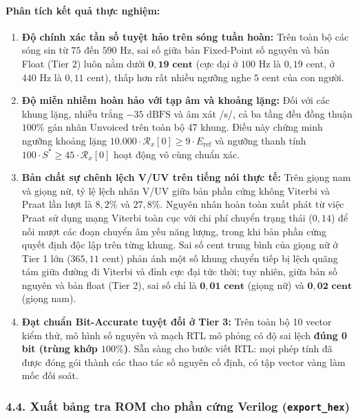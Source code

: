 \documentclass[11pt,a4paper]{article}
\begin{document}
\paragraph{Phân tích kết quả thực nghiệm:}
\begin{enumerate}
    \setlength{\itemsep}{1.5pt}
    \item \textbf{Độ chính xác tần số tuyệt hảo trên sóng tuần hoàn:} Trên toàn bộ các sóng sin từ $75$ đến $590\text{ Hz}$, sai số giữa bản Fixed-Point số nguyên và bản Float (Tier 2) luôn nằm dưới $\mathbf{0{,}19\text{ cent}}$ (cực đại ở $100\text{ Hz}$ là $0{,}19\text{ cent}$, ở $440\text{ Hz}$ là $0{,}11\text{ cent}$), thấp hơn rất nhiều ngưỡng nghe $5\text{ cent}$ của con người.
    \item \textbf{Độ miễn nhiễm hoàn hảo với tạp âm và khoảng lặng:} Đối với các khung lặng, nhiễu trắng $-35\text{ dBFS}$ và âm xát /s/, cả ba tầng đều đồng thuận $100\%$ gán nhãn Unvoiced trên toàn bộ 47 khung. Điều này chứng minh ngưỡng khoảng lặng $10.000 \cdot \mathcal{R}_x[0] \ge 9 \cdot E_{\text{ref}}$ và ngưỡng thanh tính $100 \cdot S^* \ge 45 \cdot \mathcal{R}_x[0]$ hoạt động vô cùng chuẩn xác.
    \item \textbf{Bản chất sự chênh lệch V/UV trên tiếng nói thực tế:} Trên giọng nam và giọng nữ, tỷ lệ lệch nhãn V/UV giữa bản phần cứng không Viterbi và Praat lần lượt là $8{,}2\%$ và $27{,}8\%$. Nguyên nhân hoàn toàn xuất phát từ việc Praat sử dụng mạng Viterbi toàn cục với chi phí chuyển trạng thái ($0{,}14$) để nối mượt các đoạn chuyển âm yếu năng lượng, trong khi bản phần cứng quyết định độc lập trên từng khung. Sai số cent trung bình của giọng nữ ở Tier 1 lớn ($365{,}11\text{ cent}$) phản ánh một số khung chuyển tiếp bị lệch quãng tám giữa đường đi Viterbi và đỉnh cực đại tức thời; tuy nhiên, giữa bản số nguyên và bản float (Tier 2), sai số chỉ là $\mathbf{0{,}01\text{ cent}}$ (giọng nữ) và $\mathbf{0{,}02\text{ cent}}$ (giọng nam).
    \item \textbf{Đạt chuẩn Bit-Accurate tuyệt đối ở Tier 3:} Trên toàn bộ 10 vector kiểm thử, mô hình số nguyên và mạch RTL mô phỏng có độ sai lệch \textbf{đúng 0 bit (trùng khớp $100\%$)}. Sẵn sàng cho bước viết RTL: mọi phép tính đã được đóng gói thành các thao tác số nguyên cố định, có tập vector vàng làm mốc đối soát.
\end{enumerate}

\subsubsection*{4.4. Xuất bảng tra ROM cho phần cứng Verilog (\texttt{export\_hex})}
\end{document}
